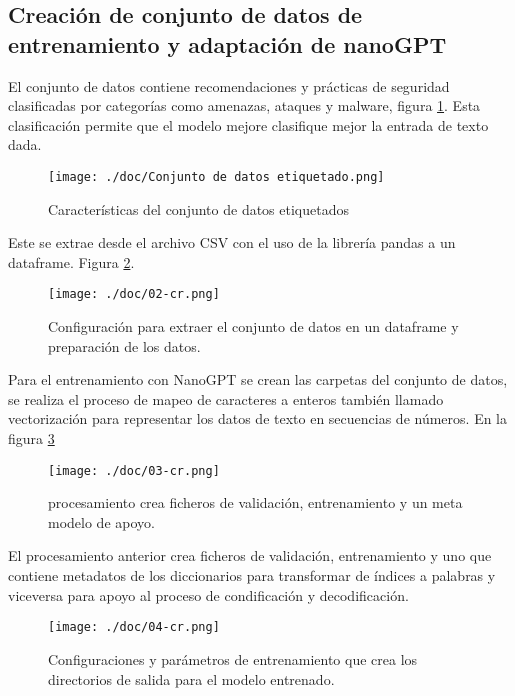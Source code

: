 
\subsection{Creación de conjunto de datos de entrenamiento y adaptación de nanoGPT}\label{section:Creación de conjunto de datos con fuentes de internet} 
El conjunto de datos contiene recomendaciones y prácticas de seguridad clasificadas por categorías como amenazas, ataques y malware, figura \ref{figure:Conjunto de datos}. Esta clasificación permite que el modelo mejore clasifique mejor la entrada de texto dada.
\begin{figure}[H]
   \centering %
       \texttt{[image: ./doc/Conjunto de datos etiquetado.png]} 
   \caption{Características del conjunto de datos etiquetados \cite{}}
  \label{figure:Conjunto de datos}  %
\end{figure}
Este se extrae desde el archivo CSV con el uso de la librería pandas a un dataframe. Figura \ref{figure:Extracción de datos del csv}.\cite{Reiss2021}
\begin{figure}[H]
   \centering %
       \texttt{[image: ./doc/02-cr.png]} 
   \caption{Configuración para extraer el conjunto de datos en un dataframe y preparación de los datos.  \cite{}}
  \label{figure:Extracción de datos del csv}  %
\end{figure}
Para el entrenamiento con NanoGPT se crean las carpetas del conjunto de datos, se realiza el proceso de mapeo de caracteres a enteros también llamado vectorización para representar los datos de texto en secuencias de números. \cite{GenerGediz2020}
En la figura \ref{figure:Etapa de encoder}
\begin{figure}[H]
   \centering %
       \texttt{[image: ./doc/03-cr.png]} 
   \caption{procesamiento crea  ficheros de validación, entrenamiento y un meta modelo de apoyo.  \cite{}}
  \label{figure:Etapa de encoder}  %
\end{figure}
El procesamiento anterior crea ficheros de validación, entrenamiento y uno que contiene metadatos de los diccionarios para transformar de índices a palabras y viceversa para apoyo al proceso de condificación y decodificación.
\begin{figure}[H]
   \centering %
       \texttt{[image: ./doc/04-cr.png]} 
   \caption{Configuraciones y parámetros de entrenamiento que crea los directorios de salida para el modelo entrenado.  \cite{}}
  \label{figure:Configuraciónes de parámetros}  %
\end{figure}
\clearpage
